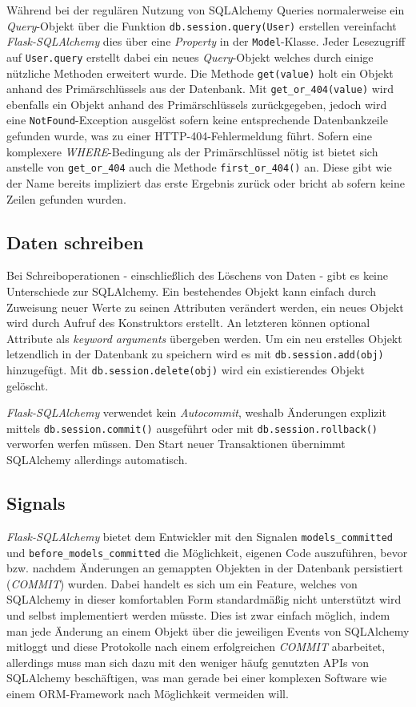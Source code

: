 Während bei der regulären Nutzung von SQLAlchemy Queries normalerweise ein \emph{Query}-Objekt über
die Funktion \lstinline{db.session.query(User)} erstellen vereinfacht \emph{Flask-SQLAlchemy} dies
über eine \emph{Property} in der \lstinline{Model}-Klasse. Jeder Lesezugriff auf
\lstinline{User.query} erstellt dabei ein neues \emph{Query}-Objekt welches durch einige nützliche
Methoden erweitert wurde. Die Methode \lstinline{get(value)} holt ein Objekt anhand des
Primärschlüssels aus der Datenbank. Mit \lstinline{get_or_404(value)} wird ebenfalls ein Objekt
anhand des Primärschlüssels zurückgegeben, jedoch wird eine \lstinline{NotFound}-Exception ausgelöst
sofern keine entsprechende Datenbankzeile gefunden wurde, was zu einer HTTP-404-Fehlermeldung führt.
Sofern eine komplexere \emph{WHERE}-Bedingung als der Primärschlüssel nötig ist bietet sich anstelle
von \lstinline{get_or_404} auch die Methode \lstinline{first_or_404()} an. Diese gibt wie der Name
bereits impliziert das erste Ergebnis zurück oder bricht ab sofern keine Zeilen gefunden wurden.

\subsection{Daten schreiben}

Bei Schreiboperationen - einschließlich des Löschens von Daten - gibt es keine Unterschiede zur
SQLAlchemy. Ein bestehendes Objekt kann einfach durch Zuweisung neuer Werte zu seinen Attributen
verändert werden, ein neues Objekt wird durch Aufruf des Konstruktors erstellt. An letzteren können
optional Attribute als \emph{keyword arguments} übergeben werden. Um ein neu erstelles Objekt
letzendlich in der Datenbank zu speichern wird es mit \lstinline{db.session.add(obj)} hinzugefügt.
Mit \lstinline{db.session.delete(obj)} wird ein existierendes Objekt gelöscht.

\emph{Flask-SQLAlchemy} verwendet kein \emph{Autocommit}, weshalb Änderungen explizit mittels
\lstinline{db.session.commit()} ausgeführt oder mit \lstinline{db.session.rollback()} verworfen
werfen müssen. Den Start neuer Transaktionen übernimmt SQLAlchemy allerdings automatisch.

\subsection{Signals}

\emph{Flask-SQLAlchemy} bietet dem Entwickler mit den Signalen \lstinline{models_committed} und
\lstinline{before_models_committed} die Möglichkeit, eigenen Code auszuführen, bevor bzw. nachdem
Änderungen an gemappten Objekten in der Datenbank persistiert (\emph{COMMIT}) wurden. Dabei handelt
es sich um ein Feature, welches von SQLAlchemy in dieser komfortablen Form standardmäßig nicht
unterstützt wird und selbst implementiert werden müsste. Dies ist zwar einfach möglich, indem man
jede Änderung an einem Objekt über die jeweiligen Events von SQLAlchemy mitloggt und diese
Protokolle nach einem erfolgreichen \emph{COMMIT} abarbeitet, allerdings muss man sich dazu mit den
weniger häufg genutzten APIs von SQLAlchemy beschäftigen, was man gerade bei einer komplexen
Software wie einem ORM-Framework nach Möglichkeit vermeiden will.

